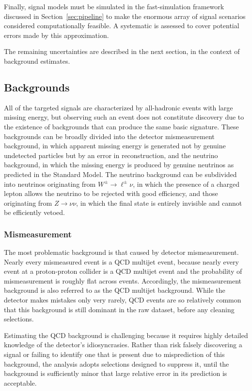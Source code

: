   Finally, signal models must be simulated in the fast-simulation framework discussed in Section~\ref{sec:pipeline} to make the enormous array of signal scenarios considered computationally feasible.
  A systematic is assessed to cover potential errors made by this approximation.

  The remaining uncertainties are described in the next section, in the context of background estimates.

  \subsection{Backgrounds} \label{sec:MT2bg}

  All of the targeted signals are characterized by all-hadronic events with large missing energy, but observing such an event does not constitute discovery due to the existence of backgrounds that can produce the same basic signature.
  These backgrounds can be broadly divided into the detector mismeasurement background, in which apparent missing energy is generated not by genuine undetected particles but by an error in reconstruction, and the neutrino background, in which the missing energy is produced by genuine neutrinos as predicted in the Standard Model.
  The neutrino background can be subdivided into neutrinos originating from $W^{\pm}\rightarrow \ell^{\pm}\nu$, in which the presence of a charged lepton allows the neutrino to be rejected with good efficiency, and those originating from $Z\rightarrow \nu\nu$, in which the final state is entirely invisible and cannot be efficiently vetoed.

  
    \subsubsection{Mismeasurement} \label{sec:MT2QCD}
  
    The most problematic background is that caused by detector mismeasurement.
    Nearly every mismeasured event is a QCD multijet event, because nearly every event at a proton-proton collider is a QCD multijet event and the probability of mismeasurement is roughly flat across events. 
    Accordingly, the mismeasurement background is also referred to as the QCD multijet background.
    While the detector makes mistakes only very rarely, QCD events are so relatively common that this background is still dominant in the raw dataset, before any cleaning selections.

    Estimating the QCD background is challenging because it requires highly detailed knowledge of the detector's idiosyncrasies.
    Rather than risk falsely discovering a signal or failing to identify one that is present due to misprediction of this background, the analysis adopts selections designed to suppress it, until the background is sufficiently minor that large relative error in its prediction is acceptable.
    
